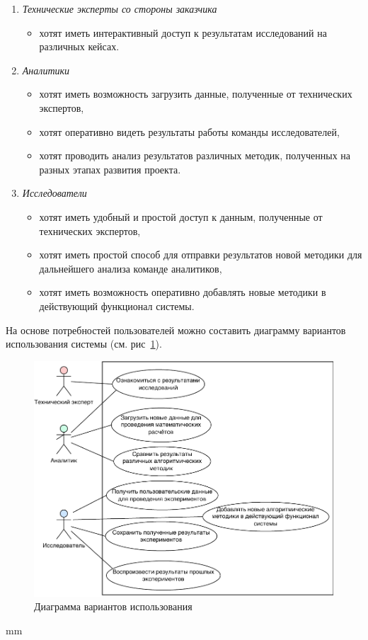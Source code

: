 \begin{enumerate}
    \item {
        \textit{Технические эксперты со стороны заказчика}
        \begin{itemize}
            \item хотят иметь интерактивный доступ к результатам исследований на различных кейсах.
        \end{itemize}
    }
    \item {
        \textit{Аналитики}
        \begin{itemize}
            \item хотят иметь возможность загрузить данные, полученные от технических экспертов,
            \item хотят оперативно видеть результаты работы команды исследователей,
            \item хотят проводить анализ результатов различных методик, полученных на разных этапах развития проекта.
        \end{itemize}
    }
    \item {
        \textit{Исследователи}
        \begin{itemize}
            \item хотят иметь удобный и простой доступ к данным, полученные от технических экспертов,
            \item хотят иметь простой способ для отправки результатов новой методики для дальнейшего анализа команде аналитиков,
            \item хотят иметь возможность оперативно добавлять новые методики в действующий функционал системы.
        \end{itemize}
    }
\end{enumerate}

На основе потребностей пользователей можно составить диаграмму вариантов использования системы
(см. рис\ \ref{pic:analysis__usecases-usecase}).

\begin{figure}[H]
	\includegraphics[width=\textwidth, left]{analysis/pictures/usecases/usecase}
	\caption{Диаграмма вариантов использования}
	\label{pic:analysis__usecases-usecase}
\end{figure}
 mm

